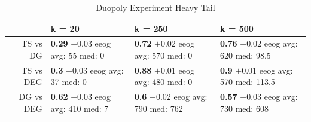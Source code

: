 \documentclass{article}
\theoremstyle{definition}
\begin{document}
\begin{table}[ht]
\centering
\caption{Duopoly Experiment Heavy Tail} 
\begin{tabular}{rlll}
  \hline
 & k = 20 & k = 250 & k = 500 \\ 
  \hline
TS vs DG & \makecell{\textbf{0.29} $\pm$0.03\\ eeog \\ avg: 55\\ med: 0} & \makecell{\textbf{0.72} $\pm$0.02\\ eeog \\ avg: 570\\ med: 0} & \makecell{\textbf{0.76} $\pm$0.02\\ eeog \\ avg: 620\\ med: 98.5} \\ 
  TS vs DEG & \makecell{\textbf{0.3} $\pm$0.03\\ eeog \\ avg: 37\\ med: 0} & \makecell{\textbf{0.88} $\pm$0.01\\ eeog \\ avg: 480\\ med: 0} & \makecell{\textbf{0.9} $\pm$0.01\\ eeog \\ avg: 570\\ med: 113.5} \\ 
  DG vs DEG & \makecell{\textbf{0.62} $\pm$0.03\\ eeog \\ avg: 410\\ med: 7} & \makecell{\textbf{0.6} $\pm$0.02\\ eeog \\ avg: 790\\ med: 762} & \makecell{\textbf{0.57} $\pm$0.03\\ eeog \\ avg: 730\\ med: 608} \\ 
   \hline
\end{tabular}
\label{sim_ht}
\end{table}
\end{document}
